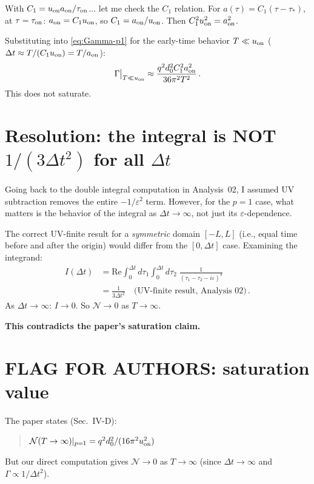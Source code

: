\documentclass[12pt]{article}
\newcommand{\Scfac}{a}
\newcommand{\Nnum}{\mathcal{N}}
\begin{document}
With $C_1 = u_{\rm on} \Scfac_{\rm on}/\tau_{\rm on}$... let me check the $C_{1}$ relation.
For $\Scfac(\tau) = C_{1}(\tau-\tau_{*})$, at $\tau=\tau_{\rm on}$:
$\Scfac_{\rm on} = C_{1}u_{\rm on}$, so $C_{1} = \Scfac_{\rm on}/u_{\rm on}$.
Then $C_{1}^{2}u_{\rm on}^{2} = \Scfac_{\rm on}^{2}$.

Substituting into \eqref{eq:Gamma-p1} for the early-time behavior $T\ll u_{\rm on}$
($\Delta t \approx T/(C_{1}u_{\rm on}) = T/\Scfac_{\rm on}$):
%
\begin{equation}
  \Gamma\big|_{T\ll u_{\rm on}} \approx \frac{q^{2}d_{0}^{2}C_{1}^{2}\Scfac_{\rm on}^{2}}{36\pi^{2}T^{2}} \,.
\end{equation}
%
This does not saturate.

\section*{Resolution: the integral is NOT $1/(3\Delta t^2)$ for all $\Delta t$}

Going back to the double integral computation in Analysis~02, I assumed UV subtraction
removes the entire $-1/\varepsilon^{2}$ term.  However, for the $p=1$ case, what matters
is the behavior of the integral as $\Delta t \to \infty$, not just its $\varepsilon$-dependence.

The correct UV-finite result for a \emph{symmetric} domain $[-L, L]$ (i.e., equal time before
and after the origin) would differ from the $[0, \Delta t]$ case.  Examining the integrand:
%
\begin{align}
  I(\Delta t)
  &=
  \mathrm{Re}\int_{0}^{\Delta t}d\tau_{1}\int_{0}^{\Delta t}d\tau_{2}
  \;\frac{1}{(\tau_{1}-\tau_{2}-i\varepsilon)^{4}} \nonumber\\
  &=
  \frac{1}{3\Delta t^{2}} \quad\text{(UV-finite result, Analysis~02)} \,.
\end{align}
%
As $\Delta t\to\infty$: $I\to 0$.  So $\Nnum\to 0$ as $T\to\infty$.

\medskip
\noindent\textbf{This contradicts the paper's saturation claim.}

\section*{FLAG FOR AUTHORS: saturation value}

The paper states (Sec.~IV-D):
\begin{quote}
$\Nnum(T\to\infty)|_{p=1} = q^{2}d_{0}^{2}/(16\pi^{2}u_{\rm on}^{2})$
\end{quote}
But our direct computation gives $\Nnum\to 0$ as $T\to\infty$ (since $\Delta t\to\infty$
and $\Gamma\propto 1/\Delta t^{2}$).
\end{document}

